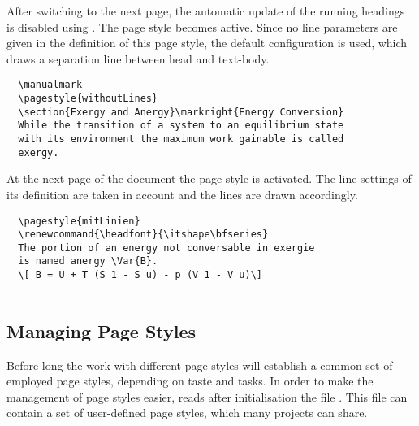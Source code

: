 \begin{Example}
After switching to the next page, the automatic update of the
running headings is disabled using .
The page style  becomes active.
Since no line parameters are given in the definition of this
page style, the default configuration is used, which draws
a separation line between head and text-body.
\begin{XmpTopPage}
        \thinlines{}
\end{XmpTopPage}

\begin{lstlisting}
  \manualmark
  \pagestyle{withoutLines}
  \section{Exergy and Anergy}\markright{Energy Conversion}
  While the transition of a system to an equilibrium state
  with its environment the maximum work gainable is called
  exergy.
\end{lstlisting}

At the next page of the document the page style 
is activated.
The line settings of its definition are taken in account and the
lines are drawn accordingly.
\begin{lstlisting}
  \pagestyle{mitLinien}
  \renewcommand{\headfont}{\itshape\bfseries}
  The portion of an energy not conversable in exergie
  is named anergy \Var{B}.
  \[ B = U + T (S_1 - S_u) - p (V_1 - V_u)\] 
  
\end{lstlisting}
\begin{XmpTopPage}
        \thicklines{}
\end{XmpTopPage}
\end{Example}

\subsection{Managing Page Styles}\label{sec:scrpage.UI.cfgFile}
Before long the work with different page styles will establish a
common set of employed page styles, depending on taste and tasks.
In order to make the management of page styles easier,
 reads after initialisation the file .
This file can contain a set of user-defined page styles, which
many projects can share.
